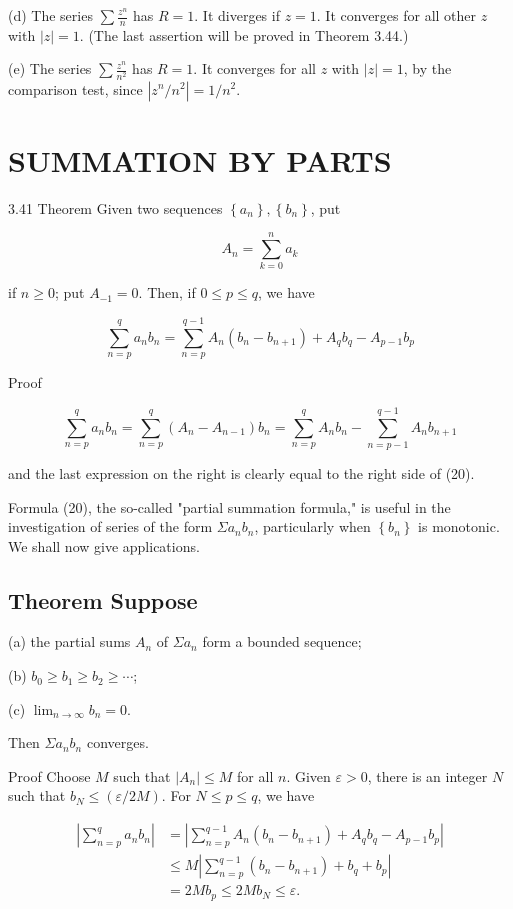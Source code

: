 \documentclass[10pt]{article}
\begin{document}
(d) The series $\sum \frac{z^{n}}{n}$ has $R=1$. It diverges if $z=1$. It converges for all other $z$ with $|z|=1$. (The last assertion will be proved in Theorem 3.44.)

(e) The series $\sum \frac{z^{n}}{n^{2}}$ has $R=1$. It converges for all $z$ with $|z|=1$, by the comparison test, since $\left|z^{n} / n^{2}\right|=1 / n^{2}$.

\section{SUMMATION BY PARTS}
3.41 Theorem Given two sequences $\left\{a_{n}\right\},\left\{b_{n}\right\}$, put

$$
A_{n}=\sum_{k=0}^{n} a_{k}
$$

if $n \geq 0$; put $A_{-1}=0$. Then, if $0 \leq p \leq q$, we have

$$
\sum_{n=p}^{q} a_{n} b_{n}=\sum_{n=p}^{q-1} A_{n}\left(b_{n}-b_{n+1}\right)+A_{q} b_{q}-A_{p-1} b_{p}
$$

Proof

$$
\sum_{n=p}^{q} a_{n} b_{n}=\sum_{n=p}^{q}\left(A_{n}-A_{n-1}\right) b_{n}=\sum_{n=p}^{q} A_{n} b_{n}-\sum_{n=p-1}^{q-1} A_{n} b_{n+1}
$$

and the last expression on the right is clearly equal to the right side of (20).

Formula (20), the so-called "partial summation formula," is useful in the investigation of series of the form $\Sigma a_{n} b_{n}$, particularly when $\left\{b_{n}\right\}$ is monotonic. We shall now give applications.

\subsection{Theorem Suppose}
(a) the partial sums $A_{n}$ of $\Sigma a_{n}$ form a bounded sequence;

(b) $b_{0} \geq b_{1} \geq b_{2} \geq \cdots$;

(c) $\lim _{n \rightarrow \infty} b_{n}=0$.

Then $\Sigma a_{n} b_{n}$ converges.

Proof Choose $M$ such that $\left|A_{n}\right| \leq M$ for all $n$. Given $\varepsilon>0$, there is an integer $N$ such that $b_{N} \leq(\varepsilon / 2 M)$. For $N \leq p \leq q$, we have

$$
\begin{aligned}
\left|\sum_{n=p}^{q} a_{n} b_{n}\right| & =\left|\sum_{n=p}^{q-1} A_{n}\left(b_{n}-b_{n+1}\right)+A_{q} b_{q}-A_{p-1} b_{p}\right| \\
& \leq M\left|\sum_{n=p}^{q-1}\left(b_{n}-b_{n+1}\right)+b_{q}+b_{p}\right| \\
& =2 M b_{p} \leq 2 M b_{N} \leq \varepsilon .
\end{aligned}
$$
\end{document}
